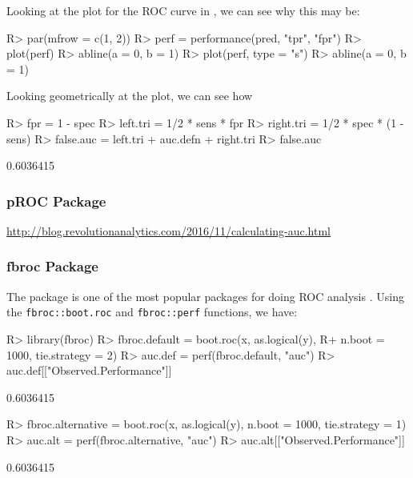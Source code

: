 \documentclass[article]{jss}
\begin{document}
Looking at the plot for the ROC curve in , we can see why this
may be:

\begin{CodeChunk}

\begin{CodeInput}
R> par(mfrow = c(1, 2))
R> perf = performance(pred, "tpr", "fpr")
R> plot(perf)
R> abline(a = 0, b = 1)
R> plot(perf, type = "s")
R> abline(a = 0, b = 1)
\end{CodeInput}
\end{CodeChunk}

Looking geometrically at the plot, we can see how

\begin{CodeChunk}

\begin{CodeInput}
R> fpr = 1 - spec
R> left.tri = 1/2 * sens * fpr
R> right.tri = 1/2 * spec * (1 - sens)
R> false.auc = left.tri + auc.defn + right.tri
R> false.auc
\end{CodeInput}

\begin{CodeOutput}
[1] 0.6036415
\end{CodeOutput}
\end{CodeChunk}

\hypertarget{proc-package}{%
\subsubsection{pROC Package}\label{proc-package}}

\url{http://blog.revolutionanalytics.com/2016/11/calculating-auc.html}

\hypertarget{fbroc-package}{%
\subsubsection{fbroc Package}\label{fbroc-package}}

The  package is one of the most popular packages for doing
ROC analysis \citep{fbroc}. Using the \texttt{fbroc::boot.roc} and
\texttt{fbroc::perf} functions, we have:

\begin{CodeChunk}

\begin{CodeInput}
R> library(fbroc)
R> fbroc.default = boot.roc(x, as.logical(y), 
R+                           n.boot = 1000, tie.strategy = 2)
R> auc.def = perf(fbroc.default, "auc")
R> auc.def[["Observed.Performance"]]
\end{CodeInput}

\begin{CodeOutput}
[1] 0.6036415
\end{CodeOutput}

\begin{CodeInput}
R> fbroc.alternative = boot.roc(x, as.logical(y), n.boot = 1000, tie.strategy = 1)
R> auc.alt = perf(fbroc.alternative, "auc")
R> auc.alt[["Observed.Performance"]]
\end{CodeInput}

\begin{CodeOutput}
[1] 0.6036415
\end{CodeOutput}
\end{CodeChunk}
\end{document}
